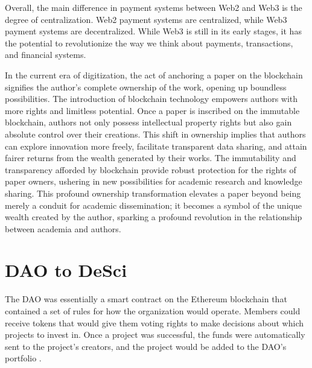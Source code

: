 \documentclass[lettersize,journal]{IEEEtran}
\begin{document}
Overall, the main difference in payment systems between Web2 and Web3 is the degree of centralization. Web2 payment systems are centralized, while Web3 payment systems are decentralized. While Web3 is still in its early stages, it has the potential to revolutionize the way we think about payments, transactions, and financial systems.



In the current era of digitization, the act of anchoring a paper on the blockchain signifies the author's complete ownership of the work, opening up boundless possibilities. The introduction of blockchain technology empowers authors with more rights and limitless potential. Once a paper is inscribed on the immutable blockchain, authors not only possess intellectual property rights but also gain absolute control over their creations. This shift in ownership implies that authors can explore innovation more freely, facilitate transparent data sharing, and attain fairer returns from the wealth generated by their works. The immutability and transparency afforded by blockchain provide robust protection for the rights of paper owners, ushering in new possibilities for academic research and knowledge sharing. This profound ownership transformation elevates a paper beyond being merely a conduit for academic dissemination; it becomes a symbol of the unique wealth created by the author, sparking a profound revolution in the relationship between academia and authors.

  

\section{DAO to DeSci}

The DAO was essentially a smart contract on the Ethereum blockchain that contained a set of rules for how the organization would operate. Members could receive tokens that would give them voting rights to make decisions about which projects to invest in. Once a project was successful, the funds were automatically sent to the project's creators, and the project would be added to the DAO's portfolio \cite{ding2022desci}.
\end{document}
